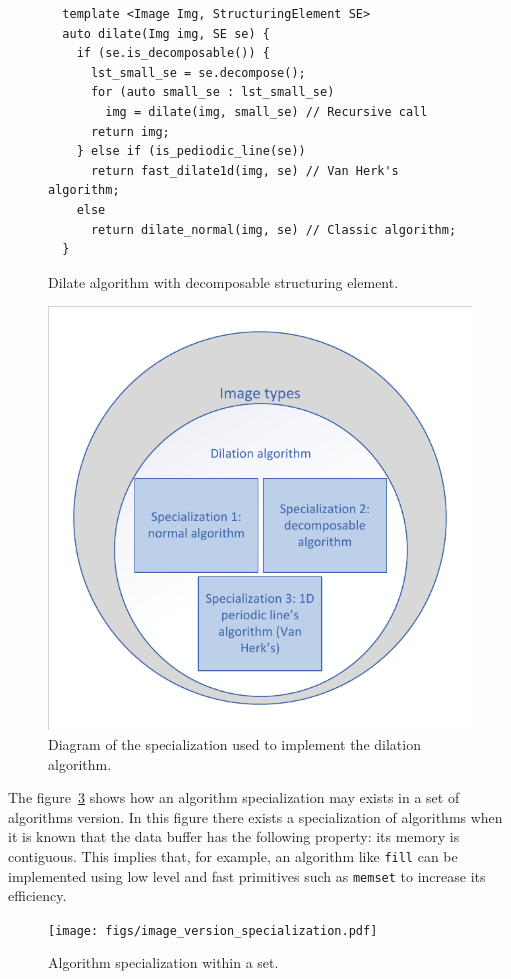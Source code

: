 \begin{figure}[tbh]
  \centering
  \begin{verbatim}
  template <Image Img, StructuringElement SE>
  auto dilate(Img img, SE se) {
    if (se.is_decomposable()) {
      lst_small_se = se.decompose();
      for (auto small_se : lst_small_se)
        img = dilate(img, small_se) // Recursive call
      return img;
    } else if (is_pediodic_line(se))
      return fast_dilate1d(img, se) // Van Herk's algorithm;
    else
      return dilate_normal(img, se) // Classic algorithm;
  }
  \end{verbatim}

  \caption{Dilate algorithm with decomposable structuring element.}
  \label{code:decomp.dilate}
\end{figure}

\begin{figure}[tbh]
  \centering
  \includegraphics[width=.5\linewidth]{figs/dilation_specialization_diagram.pdf}
  \caption{Diagram of the specialization used to implement the dilation algorithm.}
  \label{fig:dilation.specialization.diagram}
\end{figure}

The figure~\ref{fig:image.specialization} shows how an algorithm specialization may exists in a set of algorithms
version. In this figure there exists a specialization of algorithms when it is known that the data buffer has the
following property: its memory is contiguous. This implies that, for example, an algorithm like \texttt{fill} can be
implemented using low level and fast primitives such as \texttt{memset} to increase its efficiency.

\begin{figure}[tbh]
  \centering
  \texttt{[image: figs/image\_version\_specialization.pdf]}
  \caption{Algorithm specialization within a set.}
  \label{fig:image.specialization}
\end{figure}

